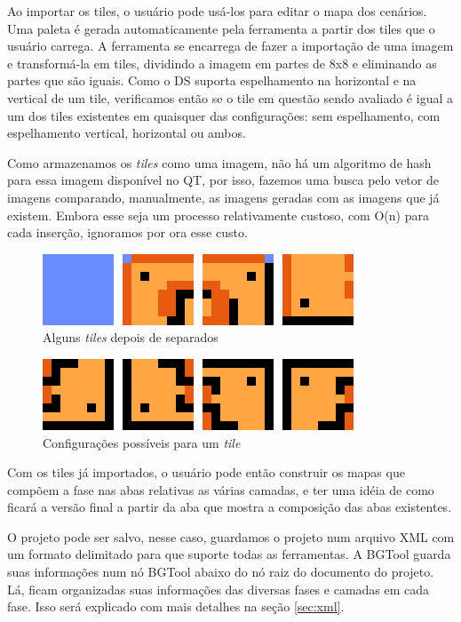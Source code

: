 \documentclass[brazil]{abnt}
\begin{document}
Ao importar os tiles, o usuário pode usá-los para editar o mapa dos cenários. Uma paleta é gerada automaticamente pela ferramenta a partir dos tiles que o usuário carrega. A ferramenta se encarrega de fazer a importação de uma imagem e transformá-la em tiles, dividindo a imagem em partes de 8x8 e eliminando as partes que são iguais. Como o DS suporta espelhamento na horizontal e na vertical de um tile, verificamos então se o tile em questão sendo avaliado é igual a um dos tiles existentes em quaisquer das configurações: sem espelhamento, com espelhamento vertical, horizontal ou ambos.

Como armazenamos os \textit{tiles} como uma imagem, não há um algoritmo de hash para essa imagem disponível no QT, por isso, fazemos uma busca pelo vetor de imagens comparando, manualmente, as imagens geradas com as imagens que já existem. Embora esse seja um processo relativamente custoso, com O(n) para cada inserção, ignoramos por ora esse custo.

\begin{figure}[h!]
\centering
\includegraphics[scale=1]{imgs/tiles1.png}
\caption{Alguns \textit{tiles} depois de separados} 
\end{figure}

\begin{figure}[h!]
\centering
\includegraphics[scale=1]{imgs/tiles2.png}
\caption{Configurações possíveis para um \textit{tile}} 
\end{figure}

Com os tiles já importados, o usuário pode então construir os mapas que compõem a fase nas abas relativas as várias camadas, e ter uma idéia de como ficará a versão final a partir da aba que mostra a composição das abas existentes.

O projeto pode ser salvo, nesse caso, guardamos o projeto num arquivo XML com um formato delimitado para que suporte todas as ferramentas. A BGTool guarda suas informações num nó BGTool abaixo do nó raiz do documento do projeto. Lá, ficam organizadas suas informações das diversas fases e camadas em cada fase. Isso será explicado com mais detalhes na seção \ref{sec:xml}.
\end{document}
